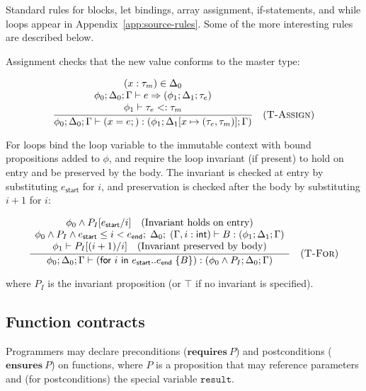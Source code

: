 Standard rules for blocks, let bindings, array assignment, if-statements, and while loops appear in Appendix~\ref{app:source-rules}. Some of the more interesting rules are described below.

Assignment checks that the new value conforms to the master type:

$$
  \frac{
    \begin{array}{c}
      (x: \tau_m) \in \Delta_0 \\
      \phi_0; \Delta_0; \Gamma \vdash e \Rightarrow (\phi_1; \Delta_1; \tau_e)  \\
      \phi_1 \vdash \tau_e <: \tau_m
    \end{array}
  }{
    \phi_0; \Delta_0; \Gamma \vdash (x = e;) : (\phi_1; \Delta_1[x \mapsto (\tau_e, \tau_m)]; \Gamma)
  } \quad (\textsc{T-Assign})
$$

For loops bind the loop variable to the immutable context with bound propositions added to $\phi$, and require the loop invariant (if present) to hold on entry and be preserved by the body. The invariant is checked at entry by substituting $e_\textsf{start}$ for $i$, and preservation is checked after the body by substituting $i + 1$ for $i$:

$$
  \frac{
  \begin{array}{c}
    \phi_0 \wedge P_I[e_\textsf{start}/i] \quad \text{(Invariant holds on entry)} \\
    \phi_0 \wedge P_I \wedge e_\textsf{start} \le i < e_\textsf{end};\; \Delta_0;\; (\Gamma, i: \textsf{int}) \vdash B : (\phi_1; \Delta_1; \Gamma) \\
    \phi_1 \vdash P_I[(i+1)/i] \quad \text{(Invariant preserved by body)}
  \end{array}
  }{
  \phi_0; \Delta_0; \Gamma \vdash (\textsf{for } i \textsf{ in } e_\textsf{start}..e_\textsf{end}\;\{B\}) : (\phi_0 \wedge P_I; \Delta_0; \Gamma)
  } \quad (\textsc{T-For})
$$

\noindent where $P_I$ is the invariant proposition (or $\top$ if no invariant is specified).

\subsection{Function contracts}

Programmers may declare preconditions ($\mathbf{requires}\ P$) and postconditions ($\mathbf{ensures}\ P$) on functions, where $P$ is a proposition that may reference parameters and (for postconditions) the special variable $\mathtt{result}$.


